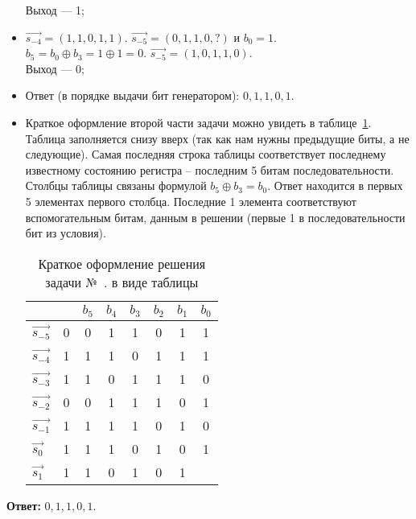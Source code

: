 \begin{itemize}
		Выход — 1;
	\item $\overrightarrow{s_{-4}}=\left(1,1,0,1,1\right)$. $\overrightarrow {s_{-5}} = \left(0,1,1,0,? \right)$ и $b_0 = 1$. \\
		$b_5 = b_0\oplus b_{3}=1 \oplus 1=0$. $\overrightarrow{s_{-5}}=\left(1,0,1,1,0\right)$. \\
		Выход — 0;
	\item Ответ (в порядке выдачи бит генератором): $0,1,1,0,1$.
	\item Краткое оформление второй части задачи можно увидеть в таблице~\ref{table:task-lfsr-1-short-solution}. Таблица заполняется снизу вверх (так как нам нужны предыдущие биты, а не следующие). Самая последняя строка таблицы соответствует последнему известному состоянию регистра -- последним 5 битам последовательности. Столбцы таблицы связаны формулой $b_{5} \oplus b_{3} = b_0 $. Ответ находится в первых 5 элементах первого столбца. Последние 1 элемента соответствуют вспомогательным битам, данным в решении (первые 1 в последовательности бит из условия).
	\begin{table}[!thb]
		\centering
		\begin{tabular}{ l | c || c c c c c|| c }
		 & & $b_{5}$& $b_{4}$& $b_{3}$& $b_{2}$& $b_{1}$ & $b_0$ \\
		  \hline
		  $\overrightarrow {s_{-5}}$ & 0 & 0 & 1 & 1 & 0 & 1& 1 \\
		  $\overrightarrow {s_{-4}}$ & 1 & 1 & 1 & 0 & 1 & 1& 1 \\
		  $\overrightarrow {s_{-3}}$ & 1 & 1 & 0 & 1 & 1 & 1& 0 \\
		  $\overrightarrow {s_{-2}}$ & 0 & 0 & 1 & 1 & 1 & 0& 1 \\
		  $\overrightarrow {s_{-1}}$ & 1 & 1 & 1 & 1 & 0 & 1& 0 \\
		  $\overrightarrow {s_{0}}$ & 1 & 1 & 1 & 0 & 1 & 0& 1 \\
		  $\overrightarrow {s_{1}}$ & 1 & 1 & 0 & 1 & 0 & 1& \cdot \\
		\hline
		\end{tabular}
		\caption{Краткое оформление решения задачи №~. в виде таблицы}
		\label{table:task-lfsr-1-short-solution}
	\end{table}
\end{itemize}
\medbreak
\textbf{Ответ:} $0, 1, 1, 0, 1$.
\bigbreak

